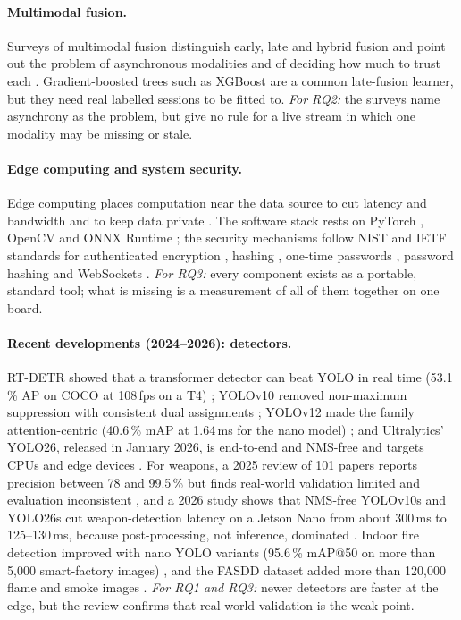 \paragraph{Multimodal fusion.} Surveys of multimodal fusion distinguish early, late and hybrid fusion and point out the problem of asynchronous modalities and of deciding how much to trust each \cite{atrey2010fusion, baltrusaitis2019multimodal}. Gradient-boosted trees such as XGBoost \cite{chen2016xgboost} are a common late-fusion learner, but they need real labelled sessions to be fitted to. \emph{For RQ2:} the surveys name asynchrony as the problem, but give no rule for a live stream in which one modality may be missing or stale.

\paragraph{Edge computing and system security.} Edge computing places computation near the data source to cut latency and bandwidth and to keep data private \cite{shi2016edge}. The software stack rests on PyTorch \cite{paszke2019pytorch}, OpenCV \cite{bradski2000opencv} and ONNX Runtime \cite{onnxruntime}; the security mechanisms follow NIST and IETF standards for authenticated encryption \cite{nist80038d}, hashing \cite{fips1804}, one-time passwords \cite{rfc6238}, password hashing \cite{rfc9106} and WebSockets \cite{rfc6455}. \emph{For RQ3:} every component exists as a portable, standard tool; what is missing is a measurement of all of them together on one board.

\paragraph{Recent developments (2024--2026): detectors.} RT-DETR showed that a transformer detector can beat YOLO in real time (53.1\,\% AP on COCO at 108\,fps on a T4) \cite{zhao2024rtdetr}; YOLOv10 removed non-maximum suppression with consistent dual assignments \cite{wang2024yolov10}; YOLOv12 made the family attention-centric (40.6\,\% mAP at 1.64\,ms for the nano model) \cite{tian2025yolov12}; and Ultralytics' YOLO26, released in January 2026, is end-to-end and NMS-free and targets CPUs and edge devices \cite{jocher2026yolo26}. For weapons, a 2025 review of 101 papers reports precision between 78 and 99.5\,\% but finds real-world validation limited and evaluation inconsistent \cite{murugan2025weaponreview}, and a 2026 study shows that NMS-free YOLOv10s and YOLO26s cut weapon-detection latency on a Jetson Nano from about 300\,ms to 125--130\,ms, because post-processing, not inference, dominated \cite{fierrosilva2026yolo26weapon}. Indoor fire detection improved with nano YOLO variants (95.6\,\% mAP@50 on more than 5,000 smart-factory images) \cite{zhang2024firefactory}, and the FASDD dataset added more than 120,000 flame and smoke images \cite{wang2025fasdd}. \emph{For RQ1 and RQ3:} newer detectors are faster at the edge, but the review confirms that real-world validation is the weak point.

